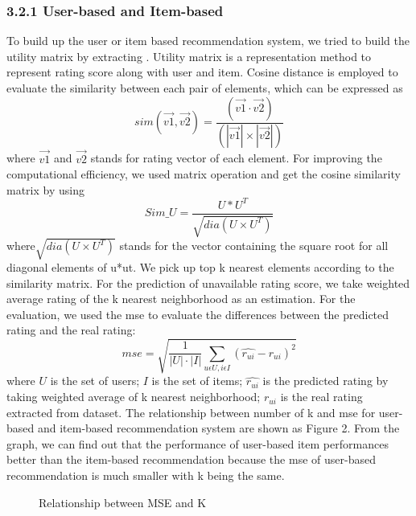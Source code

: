 \documentclass{neu_handout}
\begin{document}
\subsubsection*{3.2.1 User-based and Item-based}
To build up the user or item based recommendation system, we tried to build the utility matrix by extracting . Utility matrix is a representation method to represent rating score along with user and item. Cosine distance is employed to evaluate the similarity between each pair of elements, which can be expressed as 
  $$sim(\vec{v1}, \vec{v2}) = \frac{(\vec{v1}\cdot\vec{v2}) }{( |\vec{v1}|\times|\vec{v2}|)}$$
  where $\vec{v1}$ and $\vec{v2}$ stands for rating vector of each element. For improving the computational efficiency, we used matrix operation and get the cosine similarity matrix by using 
 $$Sim\_U=\frac{U*U^T}{\sqrt{dia(U\times U^T)}}$$
 where$ \sqrt{dia(U\times U^T)}$ stands for the vector containing the square root for all diagonal elements of u*ut. We pick up top k nearest elements according to the similarity matrix. For the prediction of unavailable rating score, we take weighted average rating of the k nearest neighborhood as an estimation. For the evaluation, we used the mse to evaluate the differences between the predicted rating and the real rating:
 $$ mse=\sqrt{\frac{1}{|U|\cdot|I|}\sum_{u\epsilon U, i\epsilon I}^{} (\hat{r_{ui}}-r_{ui})^2}$$
 where $U$ is the set of users; $I$ is the set of items; $\hat{r_{ui}}$ is the predicted rating by taking weighted average of k nearest neighborhood; $r_{ui}$ is the real rating extracted from dataset. The relationship between number of k and mse for user-based and item-based recommendation system are shown as Figure 2. From the graph, we can find out that the performance of user-based item performances better than the item-based recommendation because the mse of user-based recommendation is much smaller with k being the same.
\begin{figure}[h]
\centering
{}
\caption{Relationship between MSE and K}
\end{figure}
\end{document}
